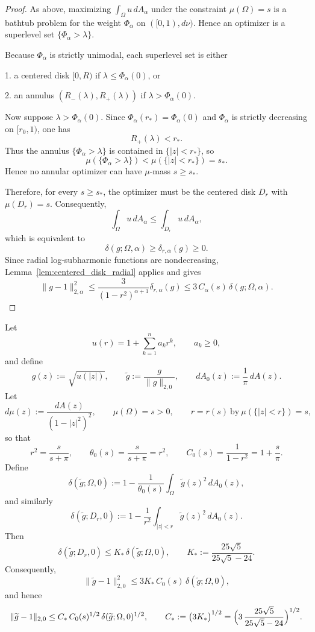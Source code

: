 \documentclass[a4paper,10pt]{amsart}
\begin{document}
\begin{proof}
As above, maximizing $\int_\Omega u\,dA_\alpha$ under the constraint $\mu(\Omega)=s$
is a bathtub problem for the weight $\Phi_\alpha$ on $([0,1),d\nu)$.
Hence an optimizer is a superlevel set $\{\Phi_\alpha>\lambda\}$.

Because $\Phi_\alpha$ is strictly unimodal, each superlevel set is either

1. a centered disk $[0,R)$ if $\lambda\le \Phi_\alpha(0)$, or

2. an annulus $(R_-(\lambda),R_+(\lambda))$ if $\lambda>\Phi_\alpha(0)$.

Now suppose $\lambda>\Phi_\alpha(0)$. Since $\Phi_\alpha(r_\ast)=\Phi_\alpha(0)$ and
$\Phi_\alpha$ is strictly decreasing on $[r_0,1)$, one has
\[
R_+(\lambda)<r_\ast.
\]
Thus the annulus $\{\Phi_\alpha>\lambda\}$ is contained in $\{|z|<r_\ast\}$, so
\[
\mu(\{\Phi_\alpha>\lambda\})<\mu(\{|z|<r_\ast\})=s_\ast.
\]
Hence no annular optimizer can have $\mu$-mass $s\ge s_\ast$.

Therefore, for every $s\ge s_\ast$, the optimizer must be the centered disk $D_r$
with $\mu(D_r)=s$. Consequently,
\[
\int_\Omega u\,dA_\alpha\le \int_{D_r}u\,dA_\alpha,
\]
which is equivalent to
\[
\delta(g;\Omega,\alpha)\ge \delta_{r,\alpha}(g)\ge 0.
\]
Since radial log-subharmonic functions are nondecreasing, Lemma~\ref{lem:centered_disk_radial} applies and gives
\[
\|g-1\|_{2,\alpha}^2
\le \frac{3}{(1-r^2)^{\alpha+1}}\delta_{r,\alpha}(g)
\le 3\,C_\alpha(s)\,\delta(g;\Omega,\alpha).
\]
\end{proof}



\begin{numprop}[A single absolute comparison constant, $\alpha=0$]
\label{prop:absolute_comparison_constant_alpha0}
Let
\[
u(r)=1+\sum_{k=1}^n a_k r^k,\qquad a_k\ge 0,
\]
and define
\[
g(z):=\sqrt{u(|z|)},\qquad \widetilde g:=\frac{g}{\|g\|_{2,0}},
\qquad
dA_0(z):=\frac1\pi\,dA(z).
\]
Let
\[
d\mu(z):=\frac{dA(z)}{(1-|z|^2)^2},
\qquad
\mu(\Omega)=s>0,
\qquad
r=r(s)\ \text{by}\ \mu(\{|z|<r\})=s,
\]
so that
\[
r^2=\frac{s}{s+\pi},
\qquad
\theta_0(s)=\frac{s}{s+\pi}=r^2,
\qquad
C_0(s)=\frac{1}{1-r^2}=1+\frac{s}{\pi}.
\]
Define
\[
\delta(\widetilde g;\Omega,0)
:=1-\frac{1}{\theta_0(s)}\int_\Omega \widetilde g(z)^2\,dA_0(z),
\]
and similarly
\[
\delta(\widetilde g;D_r,0)
:=1-\frac{1}{r^2}\int_{|z|<r}\widetilde g(z)^2\,dA_0(z).
\]
Then
\begin{equation}\label{eq:absolute_comparison_constant}
\delta(\widetilde g;D_r,0)
\le
K_\ast\,\delta(\widetilde g;\Omega,0),
\qquad
K_\ast:=\frac{25\sqrt5}{25\sqrt5-24}.
\end{equation}
Consequently,
\begin{equation}\label{eq:absolute_stability_constant}
\|\widetilde g-1\|_{2,0}^2
\le
3K_\ast\,C_0(s)\,\delta(\widetilde g;\Omega,0),
\end{equation}
and hence
\[
\|\widetilde g-1\|_{2,0}
\le
C_\ast\,C_0(s)^{1/2}\,\delta(\widetilde g;\Omega,0)^{1/2},
\qquad
C_\ast:=\bigl(3K_\ast\bigr)^{1/2}
=
\Bigl(3\,\frac{25\sqrt5}{25\sqrt5-24}\Bigr)^{1/2}.
\]
\end{numprop}
\end{document}
